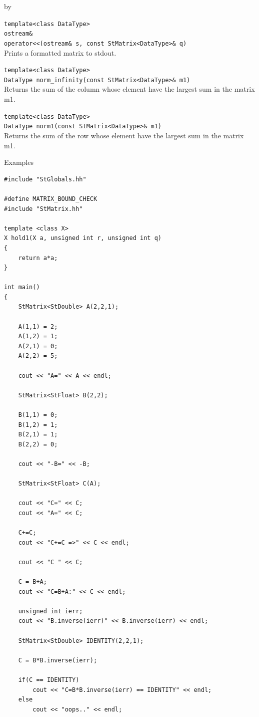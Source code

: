 \documentclass[twoside]{article}
\newcommand{\entrylabel}[1]{\mbox{\textbf{{#1}}}\hfil}%
\newenvironment{entry}
{\begin{list}{}%
    {\renewcommand{\makelabel}{\entrylabel}%
     \setlength{\labelwidth}{90pt}%
     \setlength{\leftmargin}{\labelwidth}
     \advance\leftmargin by \labelsep%
      }%
    }%
  {\end{list}}
\newcommand{\Entrylabel}[1]%
{\raisebox{0pt}[1ex][0pt]{\makebox[\labelwidth][l]%
    {\parbox[t]{\labelwidth}{\hspace{0pt}\textbf{{#1}}}}}}
\newenvironment{Entry}%
{\renewcommand{\entrylabel}{\Entrylabel}\begin{entry}}%
  {\end{entry}}
\begin{document}
\begin{description}
\begin{Entry}
  \verb+template<class DataType>+\\
  \verb+ostream&+\\
  \verb+operator<<(ostream& s, const StMatrix<DataType>& q)+\\
  Prints a formatted matrix to stdout.

  \verb+template<class DataType>+\\
  \verb+DataType norm_infinity(const StMatrix<DataType>& m1)+\\
  Returns the sum of the column whose element have
  the largest sum in the matrix m1.

  \verb+template<class DataType>+\\
  \verb+DataType norm1(const StMatrix<DataType>& m1)+\\
  Returns the sum of the row whose element have
  the largest sum in the matrix m1.
  
\item[Examples]
{\footnotesize
\begin{verbatim}
#include "StGlobals.hh"

#define MATRIX_BOUND_CHECK
#include "StMatrix.hh"

template <class X>
X hold1(X a, unsigned int r, unsigned int q)
{
    return a*a;
}

int main()
{
    StMatrix<StDouble> A(2,2,1);
    
    A(1,1) = 2;
    A(1,2) = 1;
    A(2,1) = 0;
    A(2,2) = 5;

    cout << "A=" << A << endl;

    StMatrix<StFloat> B(2,2);
    
    B(1,1) = 0;
    B(1,2) = 1;
    B(2,1) = 1;
    B(2,2) = 0;
    
    cout << "-B=" << -B;

    StMatrix<StFloat> C(A);
    
    cout << "C=" << C;
    cout << "A=" << C;
    
    C+=C;
    cout << "C+=C =>" << C << endl;

    cout << "C " << C;

    C = B+A;
    cout << "C=B+A:" << C << endl;

    unsigned int ierr;
    cout << "B.inverse(ierr)" << B.inverse(ierr) << endl;

    StMatrix<StDouble> IDENTITY(2,2,1);

    C = B*B.inverse(ierr);

    if(C == IDENTITY)
        cout << "C=B*B.inverse(ierr) == IDENTITY" << endl;
    else
        cout << "oops.." << endl;


\end{verbatim}}
\end{Entry}
\end{description}
\end{document}
